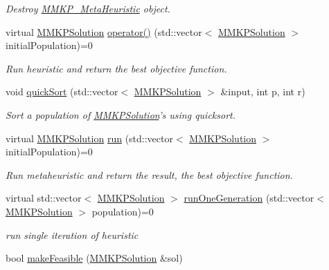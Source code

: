\begin{DoxyCompactItemize}
\begin{DoxyCompactList}\small\item\em Destroy \hyperlink{class_m_m_k_p___meta_heuristic}{M\+M\+K\+P\+\_\+\+Meta\+Heuristic} object. \end{DoxyCompactList}\item 
virtual \hyperlink{class_m_m_k_p_solution}{M\+M\+K\+P\+Solution} \hyperlink{class_m_m_k_p___meta_heuristic_acc3de42187c16d4a31776e18135035e5}{operator()} (std\+::vector$<$ \hyperlink{class_m_m_k_p_solution}{M\+M\+K\+P\+Solution} $>$ initial\+Population)=0
\begin{DoxyCompactList}\small\item\em Run heuristic and return the best objective function. \end{DoxyCompactList}\item 
void \hyperlink{class_m_m_k_p___meta_heuristic_a50620ef703c591e1ad5bc8f1fc3ae560}{quick\+Sort} (std\+::vector$<$ \hyperlink{class_m_m_k_p_solution}{M\+M\+K\+P\+Solution} $>$ \&input, int p, int r)
\begin{DoxyCompactList}\small\item\em Sort a population of \hyperlink{class_m_m_k_p_solution}{M\+M\+K\+P\+Solution}'s using quicksort. \end{DoxyCompactList}\item 
\hypertarget{class_m_m_k_p___meta_heuristic_ae8ed322572fd644d1332304c07b188a0}{virtual \hyperlink{class_m_m_k_p_solution}{M\+M\+K\+P\+Solution} \hyperlink{class_m_m_k_p___meta_heuristic_ae8ed322572fd644d1332304c07b188a0}{run} (std\+::vector$<$ \hyperlink{class_m_m_k_p_solution}{M\+M\+K\+P\+Solution} $>$ initial\+Population)=0}\label{class_m_m_k_p___meta_heuristic_ae8ed322572fd644d1332304c07b188a0}

\begin{DoxyCompactList}\small\item\em Run metaheuristic and return the result, the best objective function. \end{DoxyCompactList}\item 
\hypertarget{class_m_m_k_p___meta_heuristic_acd216490366b42ae6e44c2a7818a47a4}{virtual std\+::vector$<$ \hyperlink{class_m_m_k_p_solution}{M\+M\+K\+P\+Solution} $>$ \hyperlink{class_m_m_k_p___meta_heuristic_acd216490366b42ae6e44c2a7818a47a4}{run\+One\+Generation} (std\+::vector$<$ \hyperlink{class_m_m_k_p_solution}{M\+M\+K\+P\+Solution} $>$ population)=0}\label{class_m_m_k_p___meta_heuristic_acd216490366b42ae6e44c2a7818a47a4}

\begin{DoxyCompactList}\small\item\em run single iteration of heuristic \end{DoxyCompactList}\item 
\hypertarget{class_m_m_k_p___meta_heuristic_aef411efa1ce1674cb8c16966de476084}{bool \hyperlink{class_m_m_k_p___meta_heuristic_aef411efa1ce1674cb8c16966de476084}{make\+Feasible} (\hyperlink{class_m_m_k_p_solution}{M\+M\+K\+P\+Solution} \&sol)}\label{class_m_m_k_p___meta_heuristic_aef411efa1ce1674cb8c16966de476084}


\end{DoxyCompactItemize}
